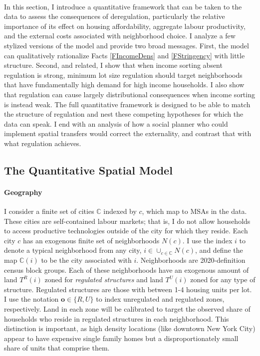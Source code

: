 \documentclass[12pt]{article}
\begin{document}
	\paragraph*{}
	In this section, I introduce a quantitative framework that can be taken to the data to assess the consequences of deregulation, particularly the relative importance of its effect on housing affordability, aggregate labour productivity, and the external costs associated with neighborhood choice. I analyze a few stylized versions of the model and provide two broad messages. First, the model can qualitatively rationalize Facts \ref{FIncomeDens} and \ref{FStringency} with little structure. Second, and related, I show that when income sorting absent regulation is strong, minimum lot size regulation should target neighborhoods that have fundamentally high demand for high income households. I also show that regulation can cause largely distributional consequences when income sorting is instead weak. The full quantitative framework is designed to be able to match the structure of regulation and nest these competing hypotheses for which the data can speak. I end with an analysis of how a social planner who could implement spatial transfers would correct the externality, and contrast that with what regulation achieves.  
	
	\subsection{The Quantitative Spatial Model}
	
	\paragraph*{Geography}
	I consider a finite set of cities $\mathbb{C}$ indexed by $c$, which map to MSAs in the data. These cities are self-contained labour markets; that is, I do not allow households to access productive technologies outside of the city for which they reside. Each city $c$ has an exogenous finite set of neighborhoods $N(c)$. I use the index $i$ to denote a typical neighborhood from any city, $i \in \cup_{c \in \mathbb{C}}N(c)$, and define the map $\mathbb{C}(i)$ to be the city associated with $i$. Neighborhoods are 2020-definition census block groups. Each of these neighborhoods have an exogenous amount of land $T^{R}(i)$ zoned for \textit{regulated structures} and land $T^{U}(i)$ zoned for any type of structure. Regulated structures are those with between 1-4 housing units per lot. I use the notation $\boldsymbol{o} \in \{R, U\}$ to index unregulated and regulated zones, respectively. Land in each zone will be calibrated to target the observed share of households who reside in regulated structures in each neighborhood. This distinction is important, as high density locations (like downtown New York City) appear to have expensive single family homes but a disproportionately small share of units that comprise them.
\end{document}
